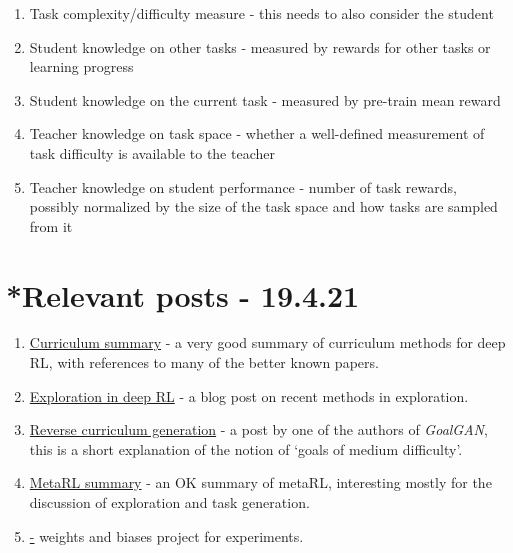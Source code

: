 \documentclass[letterpaper]{article}
\theoremstyle{definition}
\begin{document}
\begin{enumerate}
	\item Task complexity/difficulty measure - this needs to also consider the student
	\item Student knowledge on other tasks - measured by rewards for other tasks or learning progress
	\item Student knowledge on the current task - measured by pre-train mean reward
	\item Teacher knowledge on task space - whether a well-defined measurement of task difficulty is available to the teacher
	\item Teacher knowledge on student performance - number of task rewards, possibly normalized by the size of the task space and how tasks are sampled from it
\end{enumerate}

\section{*Relevant posts - 19.4.21} \label{sec:blogs}

\begin{enumerate}
	\item 
	\href{https://lilianweng.github.io/lil-log/2020/01/29/curriculum-for-reinforcement-learning.html}{Curriculum summary} - a very good summary of curriculum methods for deep RL, with references to many of the better known papers.
	
	\item \href{https://lilianweng.github.io/lil-log/2020/06/07/exploration-strategies-in-deep-reinforcement-learning.html}{Exploration in deep RL} - a blog post on recent methods in exploration.
	
	\item 
	\href{https://bair.berkeley.edu/blog/2017/12/20/reverse-curriculum/}{Reverse curriculum generation} - a post by one of the authors of \textit{GoalGAN}, this is a short explanation of the notion of `goals of medium difficulty'.
	
	\item 
	\href{https://lilianweng.github.io/lil-log/2019/06/23/meta-reinforcement-learning.html}{MetaRL summary} - an OK summary of metaRL, interesting mostly for the discussion of exploration and task generation.
	
	\item 
	\href{https://wandb.ai/liorf/curriculum_rl} - weights and biases project for experiments.

\end{enumerate}
\end{document}
